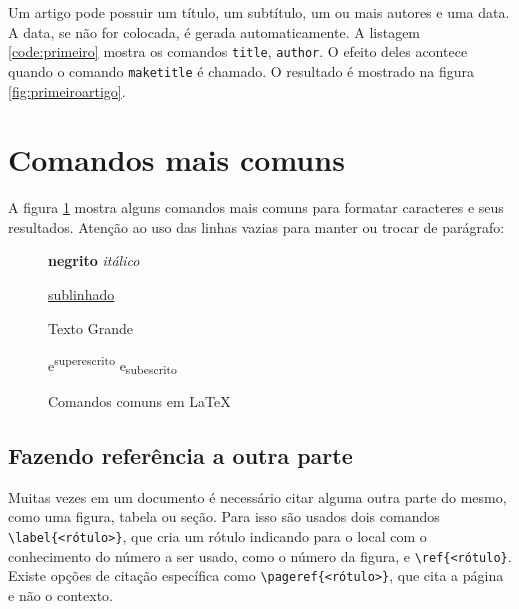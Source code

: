 Um artigo pode possuir um título, um subtítulo, um ou mais autores e uma data. A data, se não for colocada, é gerada automaticamente. A listagem \ref{code:primeiro} mostra os comandos \lstinline|title|, \lstinline|author|. O efeito deles acontece quando o comando \lstinline|maketitle| é chamado. O resultado é mostrado na figura \ref{fig:primeiroartigo}.

\section{Comandos mais comuns}

A figura \ref{fig:com:comum} mostra alguns comandos mais comuns para
formatar caracteres e seus resultados. Atenção ao uso das
linhas vazias para manter ou trocar de parágrafo:

\begin{figure}[hbt]
    \begin{LTXexample}[pos=b]
\textbf{negrito} 
\textit{itálico}

\underline{sublinhado}

\Large
Texto Grande
\normalsize

e\textsuperscript{superescrito}
e\textsubscript{subescrito}
    \end{LTXexample}
    \caption{Comandos comuns em \LaTeX}
    \label{fig:com:comum}
\end{figure}

\subsection{Fazendo referência a outra parte}

Muitas vezes em um documento é necessário citar alguma outra parte do mesmo, como uma figura, tabela ou seção. Para isso são usados dois comandos \lstinline|\label{<rótulo>}|, que cria um rótulo indicando para o local com o conhecimento do número a ser usado, como o número da figura, e \lstinline|\ref{<rótulo}|. Existe opções de citação específica como \lstinline|\pageref{<rótulo>}|, que cita a página e não o contexto.



